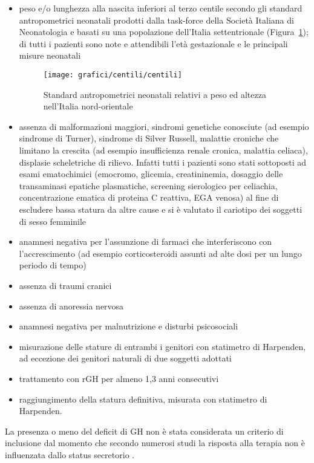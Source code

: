 \begin{itemize}
\item peso e/o lunghezza alla nascita inferiori al terzo centile secondo gli standard antropometrici neonatali prodotti dalla task-force della Società Italiana di Neonatologia e basati su una popolazione dell'Italia settentrionale\cite{standard} (Figura~\ref{fig:StandardNeonataliNordOccidentali}); di tutti i pazienti sono note e attendibili l'età gestazionale e le principali misure neonatali
\begin{figure}[!h]
  \begin{center}
      \texttt{[image: grafici/centili/centili]} %
  \end{center}
  \caption{Standard antropometrici neonatali relativi a peso ed altezza nell'Italia nord-orientale}
  \label{fig:StandardNeonataliNordOccidentali}
\end{figure}
\item assenza di malformazioni maggiori, sindromi genetiche conosciute (ad esempio sindrome di Turner), sindrome di Silver Russell, malattie croniche che limitano la crescita (ad esempio insufficienza renale cronica, malattia celiaca), displasie scheletriche di rilievo. Infatti tutti i pazienti sono stati sottoposti ad esami ematochimici (emocromo, glicemia, creatininemia, dosaggio delle transaminasi epatiche plasmatiche, screening sierologico per celiachia, concentrazione ematica di proteina C reattiva, EGA venosa) al fine di escludere bassa statura da altre cause e si è valutato il cariotipo dei soggetti di sesso femminile
 \item anamnesi negativa per l'assunzione di farmaci che interferiscono con l'accrescimento (ad esempio corticosteroidi assunti ad alte dosi per un lungo periodo di tempo)
 \item assenza di traumi cranici
 \item assenza di anoressia nervosa
 \item anamnesi negativa per malnutrizione e disturbi psicosociali
 \item misurazione delle stature di entrambi i genitori con statimetro di Harpenden, ad eccezione dei genitori naturali di due soggetti adottati
\item trattamento con rGH per almeno 1,3 anni consecutivi
\item raggiungimento della statura definitiva, misurata con statimetro di Harpenden. 
\end{itemize}

La presenza o meno del deficit di GH non è stata considerata un criterio di inclusione dal momento che secondo numerosi studi la risposta alla terapia non è influenzata dallo status secretorio\cite{sas1999growth} \cite{van2003adult}.

